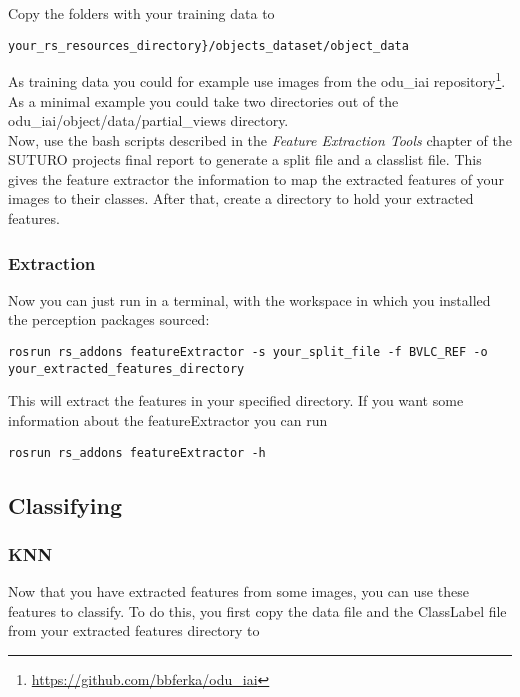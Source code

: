 \documentclass[main.tex]{subfiles}
\begin{document}
Copy the folders with your training data to 

\begin{lstlisting}
your_rs_resources_directory}/objects_dataset/object_data
\end{lstlisting}
As training data you could for example use images from the odu\_iai repository\footnote{\url{https://github.com/bbferka/odu_iai}}. As a minimal example you could take two directories out of the \linebreak odu\_iai/object/data/partial\_views directory.\\

Now, use the bash scripts described in the \textit{Feature Extraction Tools} chapter of the SUTURO projects final report to generate a split file and a classlist file. This gives the feature extractor the information to map the extracted features of your images to their classes.
After that, create a directory to hold your extracted features.

\subsubsection{Extraction}
Now you can just run in a terminal, with the workspace in which you installed the perception packages sourced:

\begin{lstlisting}
rosrun rs_addons featureExtractor -s your_split_file -f BVLC_REF -o your_extracted_features_directory
\end{lstlisting}

This will extract the features in your specified directory. If you want some information about the featureExtractor you can run

\begin{lstlisting}
rosrun rs_addons featureExtractor -h
\end{lstlisting}

\subsection{Classifying} \label{classifying}
\subsubsection{KNN}

Now that you have extracted features from some images, you can use these features to classify. To do this, you first copy the data file and the ClassLabel file from your extracted features directory to 
\end{document}
